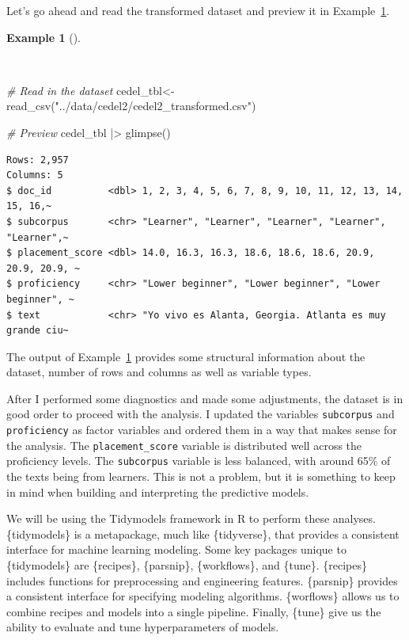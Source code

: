 \documentclass[
  letterpaper,
]{latex/krantz}
\newenvironment{Shaded}{\begin{snugshade}}{\end{snugshade}}
\newcommand{\CommentTok}[1]{\textcolor[rgb]{0.00,0.00,0.00}{\textit{#1}}}
\newcommand{\FunctionTok}[1]{\textcolor[rgb]{0.00,0.00,0.00}{#1}}
\newcommand{\NormalTok}[1]{\textcolor[rgb]{0.00,0.00,0.00}{#1}}
\newcommand{\OtherTok}[1]{\textcolor[rgb]{0.00,0.00,0.00}{#1}}
\newcommand{\SpecialCharTok}[1]{\textcolor[rgb]{0.00,0.00,0.00}{#1}}
\newcommand{\StringTok}[1]{\textcolor[rgb]{0.00,0.00,0.00}{#1}}
\theoremstyle{definition}
\newtheorem{example}{Example}[chapter]
\theoremstyle{remark}
\begin{document}
Let's go ahead and read the transformed dataset and preview it in
Example~\ref{exm-predict-cedel-read}.

\begin{example}[]\protect\hypertarget{exm-predict-cedel-read}{}\label{exm-predict-cedel-read}

~

\begin{Shaded}
\begin{Highlighting}[]
\CommentTok{\# Read in the dataset}
\NormalTok{cedel\_tbl}\OtherTok{\textless{}{-}}
  \FunctionTok{read\_csv}\NormalTok{(}\StringTok{"../data/cedel2/cedel2\_transformed.csv"}\NormalTok{)}

\CommentTok{\# Preview}
\NormalTok{cedel\_tbl }\SpecialCharTok{|\textgreater{}} \FunctionTok{glimpse}\NormalTok{()}
\end{Highlighting}
\end{Shaded}

\begin{verbatim}
Rows: 2,957
Columns: 5
$ doc_id          <dbl> 1, 2, 3, 4, 5, 6, 7, 8, 9, 10, 11, 12, 13, 14, 15, 16,~
$ subcorpus       <chr> "Learner", "Learner", "Learner", "Learner", "Learner",~
$ placement_score <dbl> 14.0, 16.3, 16.3, 18.6, 18.6, 18.6, 20.9, 20.9, 20.9, ~
$ proficiency     <chr> "Lower beginner", "Lower beginner", "Lower beginner", ~
$ text            <chr> "Yo vivo es Alanta, Georgia. Atlanta es muy grande ciu~
\end{verbatim}

\end{example}

The output of Example~\ref{exm-predict-cedel-read} provides some
structural information about the dataset, number of rows and columns as
well as variable types.

After I performed some diagnostics and made some adjustments, the
dataset is in good order to proceed with the analysis. I updated the
variables \texttt{subcorpus} and \texttt{proficiency} as factor
variables and ordered them in a way that makes sense for the analysis.
The \texttt{placement\_score} variable is distributed well across the
proficiency levels. The \texttt{subcorpus} variable is less balanced,
with around 65\% of the texts being from learners. This is not a
problem, but it is something to keep in mind when building and
interpreting the predictive models.

We will be using the Tidymodels framework in R to perform these
analyses. \{tidymodels\} is a metapackage, much like \{tidyverse\}, that
provides a consistent interface for machine learning modeling. Some key
packages unique to \{tidymodels\} are \{recipes\}, \{parsnip\},
\{workflows\}, and \{tune\}. \{recipes\} includes functions for
preprocessing and engineering features. \{parsnip\} provides a
consistent interface for specifying modeling algorithms. \{worflows\}
allows us to combine recipes and models into a single pipeline. Finally,
\{tune\} give us the ability to evaluate and tune hyperparameters of
models.
\end{document}
